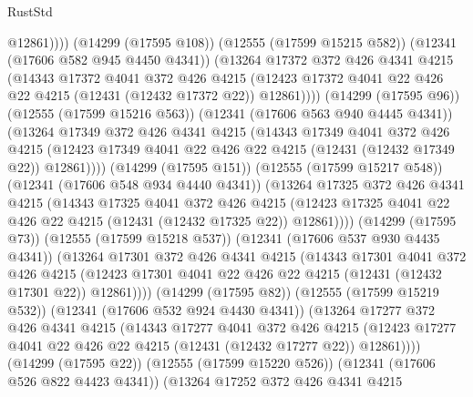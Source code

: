 \begin{lexlean}{RustStd}
\begin{coremodule}
                        @12861))))
                (@14299 (@17595 @108))
                (@12555 (@17599 @15215 @582))
                (@12341 (@17606 @582 @945 @4450 @4341))
                (@13264
                  @17372
                  @372
                  @426
                  @4341
                  @4215
                  (@14343
                    @17372
                    @4041
                    @372
                    @426
                    @4215
                    (@12423 @17372 @4041 @22 @426 @22 @4215 (@12431 (@12432 @17372 @22)) @12861))))
              (@14299 (@17595 @96))
              (@12555 (@17599 @15216 @563))
              (@12341 (@17606 @563 @940 @4445 @4341))
              (@13264
                @17349
                @372
                @426
                @4341
                @4215
                (@14343
                  @17349
                  @4041
                  @372
                  @426
                  @4215
                  (@12423 @17349 @4041 @22 @426 @22 @4215 (@12431 (@12432 @17349 @22)) @12861))))
            (@14299 (@17595 @151))
            (@12555 (@17599 @15217 @548))
            (@12341 (@17606 @548 @934 @4440 @4341))
            (@13264
              @17325
              @372
              @426
              @4341
              @4215
              (@14343
                @17325
                @4041
                @372
                @426
                @4215
                (@12423 @17325 @4041 @22 @426 @22 @4215 (@12431 (@12432 @17325 @22)) @12861))))
          (@14299 (@17595 @73))
          (@12555 (@17599 @15218 @537))
          (@12341 (@17606 @537 @930 @4435 @4341))
          (@13264
            @17301
            @372
            @426
            @4341
            @4215
            (@14343
              @17301
              @4041
              @372
              @426
              @4215
              (@12423 @17301 @4041 @22 @426 @22 @4215 (@12431 (@12432 @17301 @22)) @12861))))
        (@14299 (@17595 @82))
        (@12555 (@17599 @15219 @532))
        (@12341 (@17606 @532 @924 @4430 @4341))
        (@13264
          @17277
          @372
          @426
          @4341
          @4215
          (@14343
            @17277
            @4041
            @372
            @426
            @4215
            (@12423 @17277 @4041 @22 @426 @22 @4215 (@12431 (@12432 @17277 @22)) @12861))))
      (@14299 (@17595 @22))
      (@12555 (@17599 @15220 @526))
      (@12341 (@17606 @526 @822 @4423 @4341))
      (@13264
        @17252
        @372
        @426
        @4341
        @4215

\end{coremodule}
\end{lexlean}
